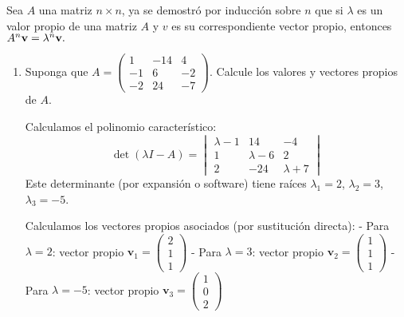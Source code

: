 \begin{prob}
Sea $A$ una matriz $n\times n$, ya se demostró por inducción sobre $n$ que si $\lambda$ es un valor propio de una matriz $A$ y $v$ es su correspondiente vector propio, entonces $A^{n}{\bf{v}}=\lambda^{n}{\bf{v}}.$  
\begin{enumerate}[$a)$]
\item Suponga que $A=\begin{pmatrix} 1&-14&4 \\ -1&6&-2\\ -2&24&-7
\end{pmatrix}.$ Calcule los valores y vectores propios de $A.$
\begin{myproof}
Calculamos el polinomio característico:
\[
\det(\lambda I - A) = \begin{vmatrix}
\lambda-1 & 14 & -4 \\
1 & \lambda-6 & 2 \\
2 & -24 & \lambda+7
\end{vmatrix}
\]
Este determinante (por expansión o software) tiene raíces $\lambda_1=2$, $\lambda_2=3$, $\lambda_3=-5$.

Calculamos los vectores propios asociados (por sustitución directa):
- Para $\lambda=2$: vector propio $\mathbf{v}_1 = \begin{pmatrix} 2 \\ 1 \\ 1 \end{pmatrix}$
- Para $\lambda=3$: vector propio $\mathbf{v}_2 = \begin{pmatrix} 1 \\ 1 \\ 1 \end{pmatrix}$
- Para $\lambda=-5$: vector propio $\mathbf{v}_3 = \begin{pmatrix} 1 \\ 0 \\ 2 \end{pmatrix}$
\end{myproof}


\end{enumerate}
\end{prob}
